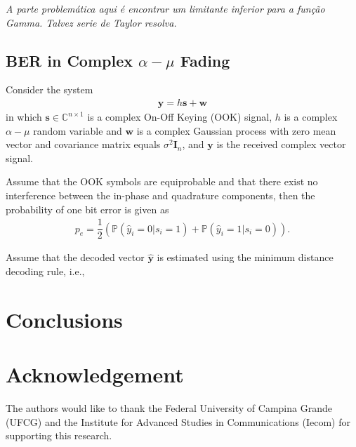 \documentclass[conference, 10pt]{IEEEtran}
\begin{document}
\textit{A parte problem\'atica aqui \'e encontrar um limitante inferior
para a fun\c c\~ao Gamma. Talvez serie de Taylor resolva.}

\subsection{BER in Complex $\alpha-\mu$ Fading}

Consider the system
\begin{align}
    \bm{y} = h\bm{s} + \bm{w}
\end{align}
in which $\bm{s} \in \mathbb{C}^{n\times 1}$ is a complex On-Off Keying (OOK) signal,
$h$ is a complex $\alpha-\mu$ random variable and $\bm{w}$ is a complex Gaussian process
with zero mean vector and covariance matrix equals $\sigma^2\bm{I}_n$, and $\bm{y}$ is
the received complex vector signal.

Assume that the OOK symbols are equiprobable and that there exist no interference
between the in-phase and quadrature components, then the probability of one bit error
is given as
\begin{align}
    p_{e} = \dfrac{1}{2}\left(\mathbb{P}\left(\hat{y}_i = 0 | s_{i} = 1\right)
                            + \mathbb{P}\left(\hat{y}_i = 1 | s_{i} = 0\right)\right).
\end{align}

Assume that the decoded vector $\bm{\hat{y}}$ is estimated using the minimum distance decoding
rule, i.e.,

\section{Conclusions}

\section*{Acknowledgement}
The authors would like to thank the Federal University of Campina Grande (UFCG)
and the Institute for Advanced Studies in Communications (Iecom) for supporting
this research.



\end{document}
